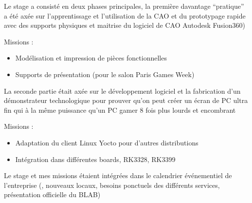 Le stage a consisté en deux phases principales, la première davantage
``pratique'' a été axée sur l'apprentissage et l'utilisation de la CAO et du
prototypage rapide avec des supports physiques
et maitrise du logiciel de CAO
Autodesk Fusion360)

Missions :
\begin{itemize}
  \item Modélisation et impression de pièces fonctionnelles
  \item Supports de présentation (pour le salon Paris Games Week)
\end{itemize}

La seconde partie était axée sur le développement logiciel et la fabrication
d'un démonstrateur technologique pour prouver qu'on peut créer un écran de PC
ultra fin qui à la même puissance qu'un PC gamer 8 fois plus lourds et
encombrant

Missions :
\begin{itemize}
  \item Adaptation du client Linux Yocto pour d'autres distributions
  \item Intégration dans différentes boards, RK3328, RK3399
\end{itemize}

Le stage et mes missions étaient intégrées dans le calendrier
événementiel de l'entreprise (\PGW, nouveaux locaux, besoins ponctuels des
différents services, présentation officielle du BLAB)

\newpage

